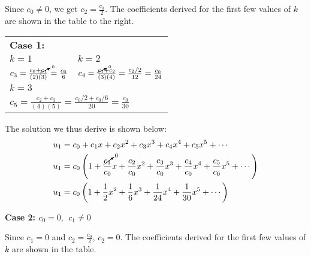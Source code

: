 \noindent Since $c_0 \ne 0$, we get $c_2 = \frac{c_0}{2}$. The coefficients derived for the first few values of $k$ are shown in the table to the right.
\begin{margintable}
\begin{tabular}{l|l}
\multicolumn{2}{l}{\textbf{Case 1:}} \\
$k=1$ & $k=2$ \\
$c_3 = \frac{c_0 + \cancelto{0}{c_1}}{(2)(3)} = \frac{c_0}{6}$ & $c_4 = \frac{\cancelto{0}{c_1}+c_2}{(3)(4)} = \frac{c_2/2}{12} = \frac{c_0}{24}$\\\hline
\multicolumn{2}{l}{$k=3$} \\
\multicolumn{2}{l}{$c_5 = \frac{c_2 + c_3}{(4)(5)} = \frac{c_0/2 + c_0/6}{20} = \frac{c_0}{30}$} \\
\end{tabular}
\end{margintable}
The solution we thus derive is shown below:
\begin{align*}
u_1 &= c_0 + c_1x + c_2x^2 + c_3x^3 + c_4x^4 + c_5x^5 + \cdots \\
u_1 &= c_0\left(1 + \frac{\cancelto{0}{c_1}}{c_0}x + \frac{c_2}{c_0}x^2 + \frac{c_3}{c_0}x^3 + \frac{c_4}{c_0}x^4 + \frac{c_5}{c_0}x^5 + \cdots \right) \\
u_1 &= c_0\left(1 + \frac{1}{2}x^2 + \frac{1}{6}x^3 + \frac{1}{24}x^4 + \frac{1}{30}x^5 + \cdots \right)
\end{align*}

\vspace{1.0cm}

\noindent\textbf{Case 2: $c_0 = 0, \ \ c_1 \ne 0$}

\noindent Since $c_1 = 0$ and $c_2 = \frac{c_0}{2}$, $c_2 = 0$.  The coefficients derived for the first few values of $k$ are shown in the table.


